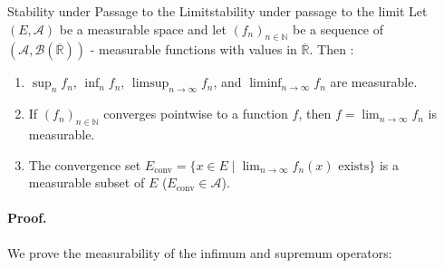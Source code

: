 
\begin{proposition}{Stability under Passage to the Limit}{stability under passage to the limit}
Let $(E, \mathcal{A})$ be a measurable space and let $(f_n)_{n \in \mathbb{N}}$ be a sequence of $(\mathcal{A}, \mathcal{B}(\overline{\mathbb{R}}))$ - measurable functions with values in $\overline{\mathbb{R}}$. Then :
\begin{enumerate}[label=\arabic*.]
    \item $\sup_{n} f_n$, $\inf_{n} f_n$, $\limsup_{n \to \infty} f_n$, and $\liminf_{n \to \infty} f_n$ are measurable.
    \item If $(f_n)_{n \in \mathbb{N}}$ converges pointwise to a function $f$, then $f = \lim_{n \to \infty} f_n$ is measurable.
    \item The convergence set $E_{\text{conv}} = \{ x \in E \mid \lim_{n \to \infty} f_n(x) \text{ exists} \}$ is a measurable subset of $E$ ($E_{\text{conv}} \in \mathcal{A}$).
\end{enumerate}
\end{proposition}

\paragraph{Proof.}
We prove the measurability of the infimum and supremum operators:

